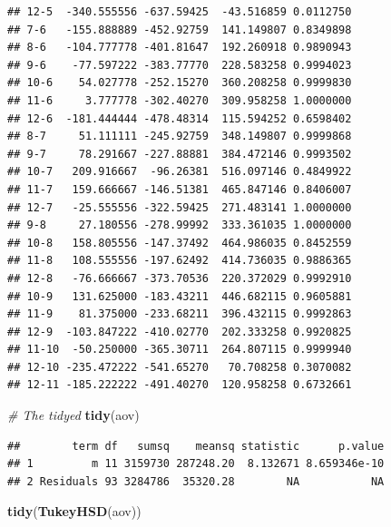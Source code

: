 \documentclass[]{book}
\newenvironment{Shaded}{\begin{snugshade}}{\end{snugshade}}
\newcommand{\KeywordTok}[1]{\textcolor[rgb]{0.13,0.29,0.53}{\textbf{{#1}}}}
\newcommand{\CommentTok}[1]{\textcolor[rgb]{0.56,0.35,0.01}{\textit{{#1}}}}
\newcommand{\NormalTok}[1]{{#1}}
\theoremstyle{definition}
\theoremstyle{definition}
\theoremstyle{remark}
\begin{document}
\begin{verbatim}
## 12-5  -340.555556 -637.59425  -43.516859 0.0112750
## 7-6   -155.888889 -452.92759  141.149807 0.8349898
## 8-6   -104.777778 -401.81647  192.260918 0.9890943
## 9-6    -77.597222 -383.77770  228.583258 0.9994023
## 10-6    54.027778 -252.15270  360.208258 0.9999830
## 11-6     3.777778 -302.40270  309.958258 1.0000000
## 12-6  -181.444444 -478.48314  115.594252 0.6598402
## 8-7     51.111111 -245.92759  348.149807 0.9999868
## 9-7     78.291667 -227.88881  384.472146 0.9993502
## 10-7   209.916667  -96.26381  516.097146 0.4849922
## 11-7   159.666667 -146.51381  465.847146 0.8406007
## 12-7   -25.555556 -322.59425  271.483141 1.0000000
## 9-8     27.180556 -278.99992  333.361035 1.0000000
## 10-8   158.805556 -147.37492  464.986035 0.8452559
## 11-8   108.555556 -197.62492  414.736035 0.9886365
## 12-8   -76.666667 -373.70536  220.372029 0.9992910
## 10-9   131.625000 -183.43211  446.682115 0.9605881
## 11-9    81.375000 -233.68211  396.432115 0.9992863
## 12-9  -103.847222 -410.02770  202.333258 0.9920825
## 11-10  -50.250000 -365.30711  264.807115 0.9999940
## 12-10 -235.472222 -541.65270   70.708258 0.3070082
## 12-11 -185.222222 -491.40270  120.958258 0.6732661
\end{verbatim}

\begin{Shaded}
\begin{Highlighting}[]
\CommentTok{# The tidyed}
\KeywordTok{tidy}\NormalTok{(aov)}
\end{Highlighting}
\end{Shaded}

\begin{verbatim}
##        term df   sumsq    meansq statistic      p.value
## 1         m 11 3159730 287248.20  8.132671 8.659346e-10
## 2 Residuals 93 3284786  35320.28        NA           NA
\end{verbatim}

\begin{Shaded}
\begin{Highlighting}[]
\KeywordTok{tidy}\NormalTok{(}\KeywordTok{TukeyHSD}\NormalTok{(aov))}
\end{Highlighting}
\end{Shaded}
\end{document}
